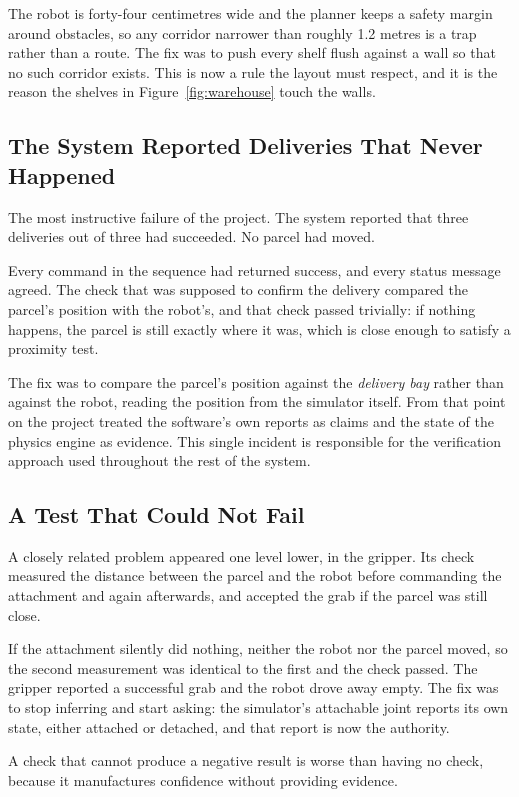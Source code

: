\documentclass[12pt,a4paper]{report}
\begin{document}
The robot is forty-four centimetres wide and the planner keeps a safety margin around obstacles, so
any corridor narrower than roughly 1.2 metres is a trap rather than a route. The fix was to push
every shelf flush against a wall so that no such corridor exists. This is now a rule the layout must
respect, and it is the reason the shelves in Figure~\ref{fig:warehouse} touch the walls.

\subsection{The System Reported Deliveries That Never Happened}
The most instructive failure of the project. The system reported that three deliveries out of three
had succeeded. No parcel had moved.

Every command in the sequence had returned success, and every status message agreed. The check that
was supposed to confirm the delivery compared the parcel's position with the robot's, and that check
passed trivially: if nothing happens, the parcel is still exactly where it was, which is close
enough to satisfy a proximity test.

The fix was to compare the parcel's position against the \emph{delivery bay} rather than against the
robot, reading the position from the simulator itself. From that point on the project treated the
software's own reports as claims and the state of the physics engine as evidence. This single
incident is responsible for the verification approach used throughout the rest of the system.

\subsection{A Test That Could Not Fail}
A closely related problem appeared one level lower, in the gripper. Its check measured the distance
between the parcel and the robot before commanding the attachment and again afterwards, and accepted
the grab if the parcel was still close.

If the attachment silently did nothing, neither the robot nor the parcel moved, so the second
measurement was identical to the first and the check passed. The gripper reported a successful grab
and the robot drove away empty. The fix was to stop inferring and start asking: the simulator's
attachable joint reports its own state, either attached or detached, and that report is now the
authority.

A check that cannot produce a negative result is worse than having no check, because it manufactures
confidence without providing evidence.
\end{document}
